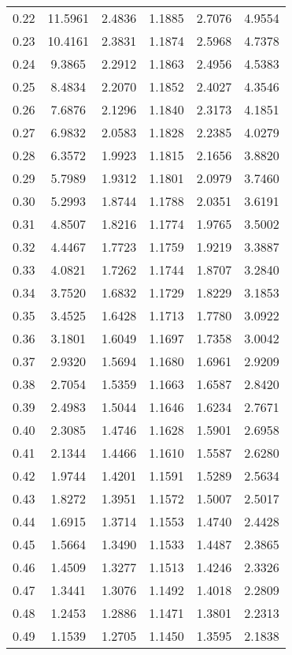 \documentclass{article}
\begin{document}
\begin{longtable}{cccccc}
0.22 & 11.5961 & 2.4836 & 1.1885 & 2.7076 & 4.9554 \\
0.23 & 10.4161 & 2.3831 & 1.1874 & 2.5968 & 4.7378 \\
0.24 & 9.3865 & 2.2912 & 1.1863 & 2.4956 & 4.5383 \\
0.25 & 8.4834 & 2.2070 & 1.1852 & 2.4027 & 4.3546 \\
0.26 & 7.6876 & 2.1296 & 1.1840 & 2.3173 & 4.1851 \\
0.27 & 6.9832 & 2.0583 & 1.1828 & 2.2385 & 4.0279 \\
0.28 & 6.3572 & 1.9923 & 1.1815 & 2.1656 & 3.8820 \\
0.29 & 5.7989 & 1.9312 & 1.1801 & 2.0979 & 3.7460 \\
0.30 & 5.2993 & 1.8744 & 1.1788 & 2.0351 & 3.6191 \\
0.31 & 4.8507 & 1.8216 & 1.1774 & 1.9765 & 3.5002 \\
0.32 & 4.4467 & 1.7723 & 1.1759 & 1.9219 & 3.3887 \\
0.33 & 4.0821 & 1.7262 & 1.1744 & 1.8707 & 3.2840 \\
0.34 & 3.7520 & 1.6832 & 1.1729 & 1.8229 & 3.1853 \\
0.35 & 3.4525 & 1.6428 & 1.1713 & 1.7780 & 3.0922 \\
0.36 & 3.1801 & 1.6049 & 1.1697 & 1.7358 & 3.0042 \\
0.37 & 2.9320 & 1.5694 & 1.1680 & 1.6961 & 2.9209 \\
0.38 & 2.7054 & 1.5359 & 1.1663 & 1.6587 & 2.8420 \\
0.39 & 2.4983 & 1.5044 & 1.1646 & 1.6234 & 2.7671 \\
0.40 & 2.3085 & 1.4746 & 1.1628 & 1.5901 & 2.6958 \\
0.41 & 2.1344 & 1.4466 & 1.1610 & 1.5587 & 2.6280 \\
0.42 & 1.9744 & 1.4201 & 1.1591 & 1.5289 & 2.5634 \\
0.43 & 1.8272 & 1.3951 & 1.1572 & 1.5007 & 2.5017 \\
0.44 & 1.6915 & 1.3714 & 1.1553 & 1.4740 & 2.4428 \\
0.45 & 1.5664 & 1.3490 & 1.1533 & 1.4487 & 2.3865 \\
0.46 & 1.4509 & 1.3277 & 1.1513 & 1.4246 & 2.3326 \\
0.47 & 1.3441 & 1.3076 & 1.1492 & 1.4018 & 2.2809 \\
0.48 & 1.2453 & 1.2886 & 1.1471 & 1.3801 & 2.2313 \\
0.49 & 1.1539 & 1.2705 & 1.1450 & 1.3595 & 2.1838 \\

\end{longtable}
\end{document}
